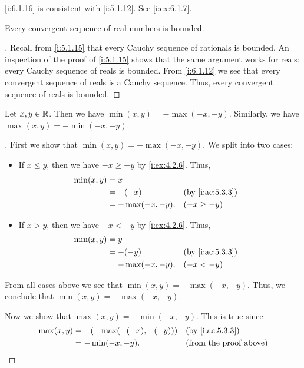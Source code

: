 \begin{note}
  \cref{i:6.1.16} is consistent with \cref{i:5.1.12}.
  See \cref{i:ex:6.1.7}.
\end{note}

\begin{cor}\label{i:6.1.17}
  Every convergent sequence of real numbers is bounded.
\end{cor}

\begin{proof}[]
  Recall from \cref{i:5.1.15} that every Cauchy sequence of rationals is bounded.
  An inspection of the proof of \cref{i:5.1.15} shows that the same argument works for reals;
  every Cauchy sequence of reals is bounded.
  From \cref{i:6.1.12} we see that every convergent sequence of reals is a Cauchy sequence.
  Thus, every convergent sequence of reals is bounded.
\end{proof}

\begin{ac}\label{i:ac:6.1.1}
  Let \(x, y \in \mathbb{R}\).
  Then we have \(\min(x, y) = -\max(-x, -y)\).
  Similarly, we have \(\max(x, y) = -\min(-x, -y)\).
\end{ac}

\begin{proof}[]
  First we show that \(\min(x, y) = -\max(-x, -y)\).
  We split into two cases:
  \begin{itemize}
    \item If \(x \leq y\), then we have \(-x \geq -y\) by \cref{i:ex:4.2.6}.
          Thus,
          \begin{align*}
            \min(x, y) & = x                                   \\
                       & = -(-x)          &  & \by{i:ac:5.3.3} \\
                       & = -\max(-x, -y). &  & (-x \geq -y)
          \end{align*}
    \item If \(x > y\), then we have \(-x < -y\) by \cref{i:ex:4.2.6}.
          Thus,
          \begin{align*}
            \min(x, y) & = y                                   \\
                       & = -(-y)          &  & \by{i:ac:5.3.3} \\
                       & = -\max(-x, -y). &  & (-x < -y)
          \end{align*}
  \end{itemize}
  From all cases above we see that \(\min(x, y) = -\max(-x, -y)\).
  Thus, we conclude that \(\min(x, y) = -\max(-x, -y)\).

  Now we show that \(\max(x, y) = -\min(-x, -y)\).
  This is true since
  \begin{align*}
    \max(x, y) & = -(-\max(-(-x), -(-y))) &  & \by{i:ac:5.3.3}               \\
               & = -\min(-x, -y).         &  & \text{(from the proof above)}
  \end{align*}
\end{proof}

